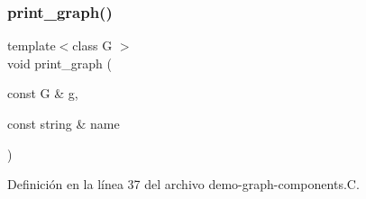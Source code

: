 \subsubsection{\texorpdfstring{print\+\_\+graph()}{print\_graph()}}
{\footnotesize\ttfamily template$<$class G $>$ \\
void print\+\_\+graph (\begin{DoxyParamCaption}\item[{const G \&}]{g,  }\item[{const string \&}]{name }\end{DoxyParamCaption})}



Definición en la línea 37 del archivo demo-\/graph-\/components.\+C.

